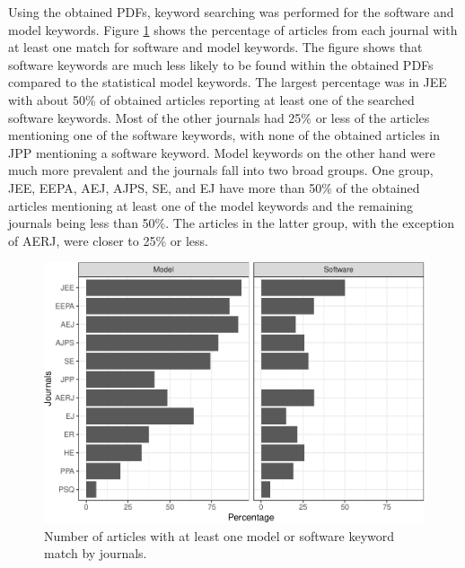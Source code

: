 \documentclass[english,,man]{apa6}
\theoremstyle{definition}
\theoremstyle{definition}
\theoremstyle{definition}
\theoremstyle{remark}
\begin{document}
Using the obtained PDFs, keyword searching was performed for the
software and model keywords. Figure \ref{fig:count-software} shows the
percentage of articles from each journal with at least one match for
software and model keywords. The figure shows that software keywords are
much less likely to be found within the obtained PDFs compared to the
statistical model keywords. The largest percentage was in JEE with about
50\% of obtained articles reporting at least one of the searched
software keywords. Most of the other journals had 25\% or less of the
articles mentioning one of the software keywords, with none of the
obtained articles in JPP mentioning a software keyword. Model keywords
on the other hand were much more prevalent and the journals fall into
two broad groups. One group, JEE, EEPA, AEJ, AJPS, SE, and EJ have more
than 50\% of the obtained articles mentioning at least one of the model
keywords and the remaining journals being less than 50\%. The articles
in the latter group, with the exception of AERJ, were closer to 25\% or
less.

\begin{figure}
\centering
\includegraphics{software_files/figure-latex/count-software-1.pdf}
\caption{\label{fig:count-software}Number of articles with at least one
model or software keyword match by journals.}
\end{figure}
\end{document}
